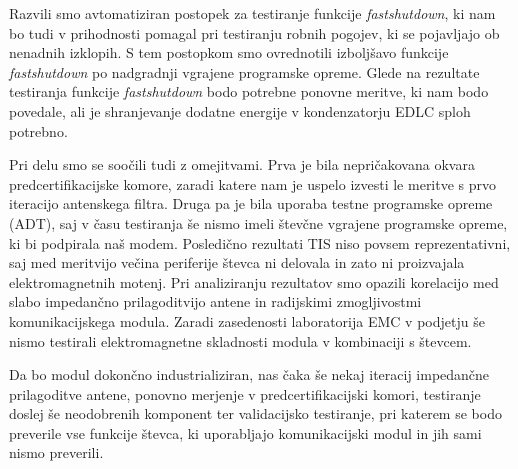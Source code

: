 \documentclass[a4paper,twoside,openright,12pt,slovene]{book}
\begin{document}
 Razvili smo avtomatiziran postopek za testiranje funkcije \textit{fastshutdown}, ki nam bo tudi v prihodnosti pomagal pri testiranju robnih pogojev, ki se pojavljajo ob nenadnih izklopih. S tem postopkom smo ovrednotili izboljšavo funkcije \textit{fastshutdown} po nadgradnji vgrajene programske opreme. Glede na rezultate testiranja funkcije \textit{fastshutdown} bodo potrebne ponovne meritve, ki nam bodo povedale, ali je shranjevanje dodatne energije v kondenzatorju EDLC sploh potrebno.

Pri delu smo se soočili tudi z omejitvami. Prva je bila nepričakovana okvara predcertifikacijske komore, zaradi katere nam je uspelo izvesti le meritve s prvo iteracijo antenskega filtra. Druga pa je bila uporaba testne programske opreme (ADT), saj v času testiranja še nismo imeli števčne vgrajene programske opreme, ki bi podpirala naš modem. Posledično rezultati TIS niso povsem reprezentativni, saj med meritvijo večina periferije števca ni delovala in zato ni proizvajala elektromagnetnih motenj. Pri analiziranju rezultatov smo opazili korelacijo med slabo impedančno prilagoditvijo antene in radijskimi zmogljivostmi komunikacijskega modula. Zaradi zasedenosti laboratorija EMC v podjetju še nismo testirali elektromagnetne skladnosti modula v kombinaciji s števcem.

Da bo modul dokončno industrializiran, nas čaka še nekaj iteracij impedančne prilagoditve antene, ponovno merjenje v predcertifikacijski komori, testiranje doslej še neodobrenih komponent ter validacijsko testiranje, pri katerem se bodo preverile vse funkcije števca, ki uporabljajo komunikacijski modul in jih sami nismo preverili.
\cleardoublepage{} %


\end{document}
